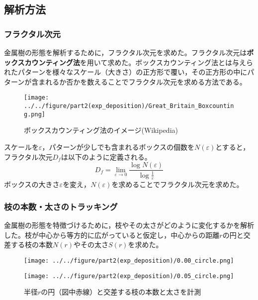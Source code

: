 \documentclass[autodetect-engine,dvi=dvipdfmx,a4paper,ja=standard,oneside,openany,11pt,draft]{bxjsarticle}
\begin{document}
\subsection{解析方法}
\subsubsection{フラクタル次元}
金属樹の形態を解析するために，フラクタル次元を求めた。フラクタル次元は\textbf{ボックスカウンティング法}を用いて求めた。ボックスカウンティング法とは与えられたパターンを様々なスケール（大きさ）の正方形で覆い，その正方形の中にパターンが含まれるか否かを数えることでフラクタル次元を求める方法である。
\begin{figure}[H]
  \centering
  \texttt{[image: ../../figure/part2(exp\_deposition)/Great\_Britain\_Boxcounting.png]}
  \caption{ボックスカウンティング法のイメージ(Wikipedia)}
  \label{fig:box_counting}
\end{figure}
スケールを$\varepsilon$，パターンが少しでも含まれるボックスの個数を$N(\varepsilon)$とすると，フラクタル次元$D_f$は以下のように定義される。
\begin{equation}
  D_f = \lim_{\varepsilon \to 0} \frac{\log N(\varepsilon)}{\log \frac{1}{\varepsilon}}
\end{equation}
ボックスの大きさ$\varepsilon$を変え，$N(\varepsilon)$を求めることでフラクタル次元を求めた。
\subsubsection{枝の本数・太さのトラッキング}
金属樹の形態を特徴づけるために，枝やその太さがどのように変化するかを解析した。枝が中心から等方的に広がっていると仮定し，中心からの距離$r$の円と交差する枝の本数$N(r)$やその太さ$S(r)$を求めた。
\begin{figure}[H]
  \begin{minipage}
    {0.5\textwidth}
    \centering
    \texttt{[image: ../../figure/part2(exp\_deposition)/0.00\_circle.png]}
    \label{fig:0.00_circle}
  \end{minipage}
  \begin{minipage}
    {0.5\textwidth}
    \centering
    \texttt{[image: ../../figure/part2(exp\_deposition)/0.05\_circle.png]}
    \label{fig:0.05_circle}
  \end{minipage}
  \caption{半径$r$の円（図中赤線）と交差する枝の本数と太さを計測}
\end{figure}
\end{document}
